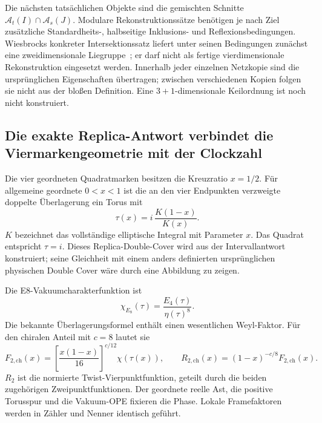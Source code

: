 Die nächsten tatsächlichen Objekte sind die gemischten Schnitte
$\mathcal A_t(I)\cap\mathcal A_s(J)$. Modulare Rekonstruktionssätze benötigen je nach Ziel zusätzliche Standardheits-, halbseitige Inklusions- und Reflexionsbedingungen. Wiesbrocks konkreter Intersektionssatz liefert unter seinen Bedingungen zunächst eine zweidimensionale Liegruppe~\cite{wiesbrockintersection}; er darf nicht als fertige vierdimensionale Rekonstruktion eingesetzt werden. Innerhalb jeder einzelnen Netzkopie sind die ursprünglichen Eigenschaften übertragen; zwischen verschiedenen Kopien folgen sie nicht aus der bloßen Definition. Eine $3+1$-dimensionale Keilordnung ist noch nicht konstruiert.


\subsection{Die exakte Replica-Antwort verbindet die Viermarkengeometrie mit der Clockzahl}\label{sec:nativereplica}
Die vier geordneten Quadratmarken besitzen die Kreuzratio $x=1/2$. Für allgemeine geordnete $0<x<1$ ist die an den vier Endpunkten verzweigte doppelte Überlagerung ein Torus mit
\begin{equation}
\tau(x)=i\,\frac{K(1-x)}{K(x)}.
\end{equation}
$K$ bezeichnet das vollständige elliptische Integral mit Parameter $x$. Das Quadrat entspricht $\tau=i$. Dieses Replica-Double-Cover wird aus der Intervallantwort konstruiert; seine Gleichheit mit einem anders definierten ursprünglichen physischen Double Cover wäre durch eine Abbildung zu zeigen.

Die E8-Vakuumcharakterfunktion ist
\begin{equation}
\chi_{E_8}(\tau)=\frac{E_4(\tau)}{\eta(\tau)^8}.
\end{equation}
Die bekannte Überlagerungsformel enthält einen wesentlichen Weyl-Faktor. Für den chiralen Anteil mit $c=8$ lautet sie~\cite{headrickreplica,castroanomaly}
\begin{equation}
F_{2,\mathrm{ch}}(x)
=\left[\frac{x(1-x)}{16}\right]^{c/12}\chi(\tau(x)),
\qquad
R_{2,\mathrm{ch}}(x)=(1-x)^{-c/8}F_{2,\mathrm{ch}}(x).
\end{equation}
$R_2$ ist die normierte Twist-Vierpunktfunktion, geteilt durch die beiden zugehörigen Zweipunktfunktionen. Der geordnete reelle Ast, die positive Torusspur und die Vakuum-OPE fixieren die Phase. Lokale Framefaktoren werden in Zähler und Nenner identisch geführt.

